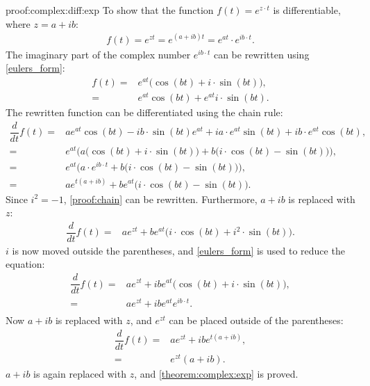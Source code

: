 \begin{prof}{}{proof:complex:diff:exp}
To show that the function $f(t)=e^{z\cdot t}$ is differentiable, where $z=a+ ib$:
\begin{align*}
	f(t) = e^{zt}= e^{(a+ib)t}= e^{at} \cdot e^{ib\cdot t}.
\end{align*}
The imaginary part of the complex number $e^{ib\cdot t}$ can be rewritten using \cref{eulers_form}:
\begin{align*}
	f(t) =& e^{at}\big(\cos(bt)+i \cdot \sin(bt)\big), \\
		 =& e^{at}\cos(bt) + e^{at} i \cdot \sin(bt).
\end{align*}
The rewritten function can be differentiated using the chain rule:
\begin{align}
	\dfrac{d}{dt}f(t) =& ae^{at}\cos(bt) -ib \cdot \sin(bt)e^{at} + ia \cdot e^{at}\sin(bt) + ib \cdot e^{at}\cos(bt), \nonumber \\
	=& e^{at} \bigg( a\big(\cos(bt) + i \cdot \sin(bt)\big) + b\big(i \cdot \cos(bt) - \sin(bt)\big) \bigg), \nonumber \\
	=& e^{at}\bigg(a \cdot e^{ib \cdot t}+b\big(i \cdot \cos(bt) - \sin(bt)\big)\bigg), \nonumber \\
	=& a e^{t(a+ib)} + b e^{at}\big(i \cdot \cos(bt) - \sin(bt)\big). \label{proof:chain}
\end{align}
Since $i^2 = -1$, \eqref{proof:chain} can be rewritten. Furthermore, $a+ib$ is replaced with $z$:
\begin{align*}
	\dfrac{d}{dt}f(t) =& a e^{zt} + b e^{at}\big(i \cdot \cos(bt) + i^2 \cdot \sin(bt)\big).
\end{align*}
$i$ is now moved outside the parentheses, and \cref{eulers_form} is used to reduce the equation:
\begin{align*}
	\dfrac{d}{dt}f(t) =&  a e^{zt} + ib e^{at}\big(\cos(bt) + i \cdot \sin(bt)\big), \\
	=&  a e^{zt} + ib e^{at}e^{ib \cdot t}. \\
\end{align*}
Now $a+ib$ is replaced with $z$, and $e^{zt}$ can be placed outside of the parentheses:
\begin{align*}
	\dfrac{d}{dt}f(t) =&  a e^{zt} + ib e^{t(a+ib)}, \\
	=&  e^{zt}(a+ib).
\end{align*}
$a+ib$ is again replaced with $z$, and \cref{theorem:complex:exp} is proved.
\end{prof}
